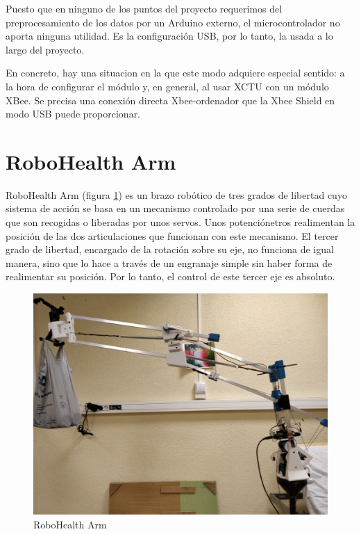 Puesto que en ninguno de los puntos del proyecto requerimos del preprocesamiento de los datos por un Arduino externo, el microcontrolador no aporta ninguna utilidad. Es la configuración USB, por lo tanto, la usada a lo largo del proyecto.

En concreto, hay una situacion en la que este modo adquiere especial sentido: a la hora de configurar el módulo y, en general, al usar XCTU con un módulo XBee. Se precisa una conexión directa Xbee-ordenador que la Xbee Shield en modo USB puede proporcionar.


\section{RoboHealth Arm}

RoboHealth Arm\cite{Heredia1:2018} (figura \ref{fig:RHA}) es un brazo robótico de tres grados de libertad cuyo sistema de acción se basa en un mecanismo controlado por una serie de cuerdas que son recogidas o liberadas por unos servos. Unos potenciónetros realimentan la posición de las dos articulaciones que funcionan con este mecanismo. El tercer grado de libertad, encargado de la rotación sobre su eje, no funciona de igual manera, sino que lo hace a través de un engranaje simple sin haber forma de realimentar su posición. Por lo tanto, el control de este tercer eje es absoluto.

\begin{figure}[bth]
\centering
\includegraphics[width=1.1\textwidth, frame]{figuras/RHA.png}
\caption{RoboHealth Arm}
\label{fig:RHA}
\end{figure}

